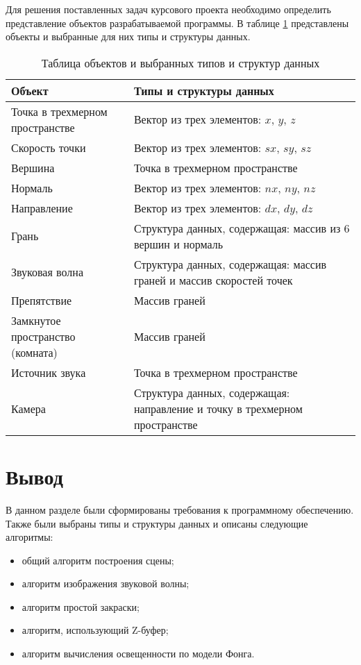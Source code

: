Для решения поставленных задач курсового проекта необходимо определить представление объектов разрабатываемой программы.
В таблице \ref{table:types} представлены объекты и выбранные для них типы и структуры данных.
\begin{table}[h!]
	\begin{center}
		\caption{\label{table:types} Таблица объектов и выбранных типов и структур данных}
		\begin{tabular}{|p{230pt}|p{230pt}|}
			\hline
			Объект & Типы и структуры данных \\ \hline
			Точка в трехмерном пространстве & Вектор из трех элементов: $x$, $y$, $z$ \\ \hline
			Скорость точки & Вектор из трех элементов: $sx$, $sy$, $sz$ \\ \hline
			Вершина & Точка в трехмерном пространстве \\ \hline
			Нормаль & Вектор из трех элементов: $nx$, $ny$, $nz$ \\ \hline
			Направление & Вектор из трех элементов: $dx$, $dy$, $dz$ \\ \hline
			Грань & Структура данных, содержащая: массив из 6 вершин и нормаль \\ \hline
			Звуковая волна & Структура данных, содержащая: массив граней и массив скоростей точек \\ \hline
			Препятствие & Массив граней \\ \hline
			Замкнутое пространство (комната) & Массив граней \\ \hline
			Источник звука & Точка в трехмерном пространстве \\ \hline
			Камера & Структура данных, содержащая: направление и точку в трехмерном пространстве \\ \hline
		\end{tabular}
	\end{center}
\end{table}

\section{Вывод}

В данном разделе были сформированы требования к программному обеспечению.
Также были выбраны типы и структуры данных и описаны следующие алгоритмы:
\begin{itemize}
	\item общий алгоритм построения сцены;
	\item алгоритм изображения звуковой волны;
	\item алгоритм простой закраски;
	\item алгоритм, использующий Z-буфер;
	\item алгоритм вычисления освещенности по модели Фонга.
\end{itemize}
